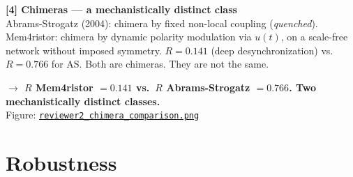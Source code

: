 \documentclass[11pt, a4paper]{article}
\newcommand{\result}[1]{\textbf{\color{positive}#1}}
\begin{document}
\vspace{0.5em}

\begin{finding}
\textbf{[4] Chimeras --- a mechanistically distinct class}\\
Abrams-Strogatz (2004): chimera by fixed non-local coupling (\textit{quenched}). Mem4ristor: chimera
by dynamic polarity modulation via $u(t)$, on a scale-free network without imposed symmetry.
$R = 0.141$ (deep desynchronization) vs.\ $R = 0.766$ for AS. Both are chimeras. They are not the
same.

\result{$\rightarrow$ $R$ Mem4ristor $= 0.141$ vs.\ $R$ Abrams-Strogatz $= 0.766$. Two mechanistically distinct classes.}\\
Figure: \href{https://github.com/cafe-virtuel/Mem4ristor/blob/main/figures/reviewer2_chimera_comparison.png}{\texttt{reviewer2\_chimera\_comparison.png}}
\end{finding}

\section{Robustness}
\end{document}
